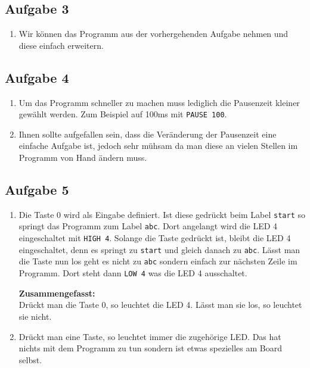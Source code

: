 \ifteacher
\newpage
\subsection{Aufgabe 3}
\begin{enumerate}[label=(\alph*)]
	\item Wir können das Programm aus der vorhergehenden Aufgabe nehmen
	und diese einfach erweitern.
	
\end{enumerate}
\fi

\ifteacher
\newpage
\subsection{Aufgabe 4}
\begin{enumerate}[label=(\alph*)]
	\item Um das Programm schneller zu machen muss lediglich die Pausenzeit
	kleiner gewählt werden. Zum Beispiel auf 100ms mit
	\lstinline{PAUSE 100}.
	\item Ihnen sollte aufgefallen sein, dass die Veränderung der Pausenzeit
	eine einfache Aufgabe ist, jedoch sehr mühsam da man diese an vielen 
	Stellen im Programm von Hand ändern muss.
\end{enumerate}
\fi

\ifteacher
\newpage
\subsection{Aufgabe 5}
\begin{enumerate}[label=(\alph*)]
	\item Die Taste 0 wird als Eingabe definiert. Ist diese gedrückt
	beim Label \lstinline{start} so springt das Programm zum Label 
	\lstinline{abc}. Dort angelangt wird die LED 4 eingeschaltet mit
	\lstinline{HIGH 4}. Solange die Taste gedrückt ist, bleibt die
	LED 4 eingeschaltet, denn es springt zu \lstinline{start} und
	gleich danach zu \lstinline{abc}. Lässt man die Taste nun los
	geht es nicht zu \lstinline{abc} sondern einfach zur nächsten Zeile
	im Programm. Dort steht dann \lstinline{LOW 4} was die LED 4
	ausschaltet.

	\textbf{Zusammengefasst:}\\
	Drückt man die Taste 0, so leuchtet die LED 4.
	Lässt man sie los, so leuchtet sie nicht.
	\item Drückt man eine Taste, so leuchtet immer die zugehörige LED.
	Das hat nichts mit dem Programm zu tun sondern ist etwas spezielles
	am Board selbst.
\end{enumerate}
\fi

